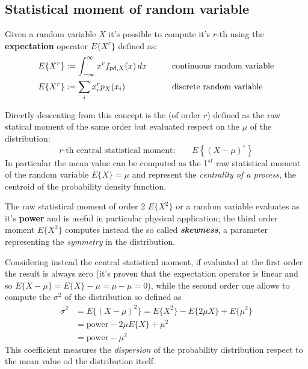 	\subsection{Statistical moment of random variable}	
		Given a random variable $X$ it's possible to compute it's $r$-th  using the \textbf{expectation} operator $E\{X^r\}$ defined as:
		\begin{equation}
		\begin{aligned}
			E\{X^r\}& := \int_{-\infty}^\infty x^r f_{pd,X}(x)\, dx   \qquad && \text{continuous random variable} \\
			E\{X^r\}& := \sum_i x_i^r p_X(x_i) && \text{discrete random variable} 
		\end{aligned}
		\end{equation}
		
		Directly descenting from this concept is the  (of order $r$) defined as the raw statical moment of the same order but evaluated respect on the  $\mu$ of the distribution:
		\begin{equation}
			\text{$r$-th central statistical moment:} \qquad E\left\{ (X-\mu)^r \right\}
		\end{equation}
		In particular the mean value can be computed as the 1$^{st}$ raw statistical moment of the random variable $E\{X\} = \mu$ and represent the \textit{centrality of a process}, the centroid of the probability density function.
		
		The raw statistical moment of order 2 $E\{X^2\}$ or a random variable evaluates as it's \textbf{power} and is useful in particular physical application; the third order moment $E\{X^3\}$ computes instead the so called \textbf{\textit{skewness}}, a parameter representing the \textit{symmetry} in the distribution. \vspace{3mm}
		
		Considering instead the central statistical moment, if evaluated at the first order the result is always zero (it's proven that the expectation operator is linear and so $E\{X-\mu\} = E\{X\} - \mu = \mu - \mu =0$), while the second order one allows to compute the  $\sigma^2$ of the distribution so defined as
		\begin{equation}
		\begin{aligned}
			\sigma^2 & = E\big\{ (X-\mu)^2 \big\} = E\{X^2\} - E\{2\mu X\} + E\{\mu^2\} \\
			& = \textrm{power} - 2 \mu E\{X\} + \mu ^2 \\ & = \textrm{power} - \mu^2
		\end{aligned}
		\end{equation}
		This coefficient measures the \textit{dispersion} of the probability distribution respect to the mean value od the distribution itself.
	
